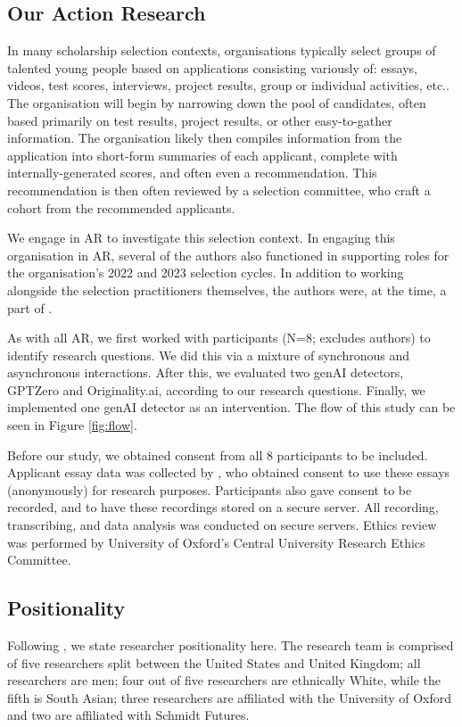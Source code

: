 \subsection{Our Action Research}
In many scholarship selection contexts, organisations typically select groups of talented young people based on applications consisting variously of: essays, videos, test scores, interviews, project results, group or individual activities, etc.. The organisation will begin by narrowing down the pool of candidates, often based primarily on test results, project results, or other easy-to-gather information. The organisation likely then compiles information from the application into short-form summaries of each applicant, complete with internally-generated scores, and often even a recommendation. This recommendation is then often reviewed by a selection committee, who craft a cohort from the recommended applicants.

We engage \rise in AR to investigate this selection context. In engaging this organisation in AR, several of the authors also functioned in supporting roles for the organisation's 2022 and 2023 selection cycles. In addition to working alongside the selection practitioners themselves, the authors were, at the time, a part of \rise.

As with all AR, we first worked with participants (N=8; excludes authors) to identify research questions. We did this via a mixture of synchronous and asynchronous interactions. After this, we evaluated two genAI detectors, GPTZero and Originality.ai, according to our research questions. Finally, we implemented one genAI detector as an intervention. The flow of this study can be seen in Figure \ref{fig:flow}.

Before our study, we obtained consent from all 8 participants to be included. Applicant essay data was collected by \rise, who obtained consent to use these essays (anonymously) for research purposes. Participants also gave consent to be recorded, and to have these recordings stored on a secure server. All recording, transcribing, and data analysis was conducted on secure servers. Ethics review was performed by University of Oxford's Central University Research Ethics Committee.

\subsection{Positionality}
Following \textcite{venn-wycherley_realities_2024}, we state researcher positionality here. The research team is comprised of five researchers split between the United States and United Kingdom; all researchers are men; four out of five researchers are ethnically White, while the fifth is South Asian; three researchers are affiliated with the University of Oxford and two are affiliated with Schmidt Futures.

